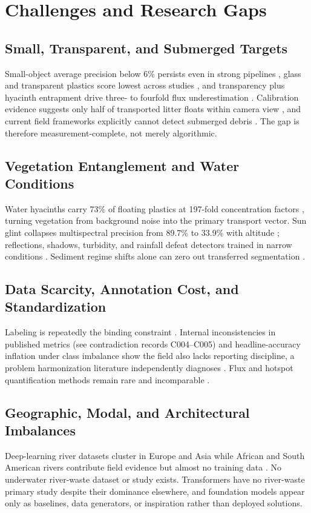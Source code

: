\section{Challenges and Research Gaps}
\label{sec:challenges}

\subsection{Small, Transparent, and Submerged Targets}
Small-object average precision below 6\% persists even in strong pipelines \cite{Tharani2021}, glass and transparent plastics score lowest across studies \cite{Nunkhaw2024}, and transparency plus hyacinth entrapment drive three- to fourfold flux underestimation \cite{JiaFlux2025}. Calibration evidence suggests only half of transported litter floats within camera view \cite{Wolf2022}, and current field frameworks explicitly cannot detect submerged debris \cite{Nunkhaw2025}. The gap is therefore measurement-complete, not merely algorithmic.

\subsection{Vegetation Entanglement and Water Conditions}
Water hyacinths carry 73\% of floating plastics at 197-fold concentration factors \cite{Saigon2025}, turning vegetation from background noise into the primary transport vector. Sun glint collapses multispectral precision from 89.7\% to 33.9\% with altitude \cite{Cortesi2022}; reflections, shadows, turbidity, and rainfall defeat detectors trained in narrow conditions \cite{Lin2021,Tharani2021,Putra2021,Lee2025}. Sediment regime shifts alone can zero out transferred segmentation \cite{SoleGomez2022}.

\subsection{Data Scarcity, Annotation Cost, and Standardization}
Labeling is repeatedly the binding constraint \cite{Jia2023,JiaFrontiers2023,Lin2021}. Internal inconsistencies in published metrics (see contradiction records C004--C005) and headline-accuracy inflation under class imbalance \cite{Mohsen2023} show the field also lacks reporting discipline, a problem harmonization literature independently diagnoses \cite{Hurley2023}. Flux and hotspot quantification methods remain rare and incomparable \cite{Lieshout2020,JiaFlux2025}.

\subsection{Geographic, Modal, and Architectural Imbalances}
Deep-learning river datasets cluster in Europe and Asia while African and South American rivers contribute field evidence but almost no training data \cite{Atuhaire2025}. No underwater river-waste dataset or study exists. Transformers have no river-waste primary study despite their dominance elsewhere, and foundation models appear only as baselines, data generators, or inspiration rather than deployed solutions.
